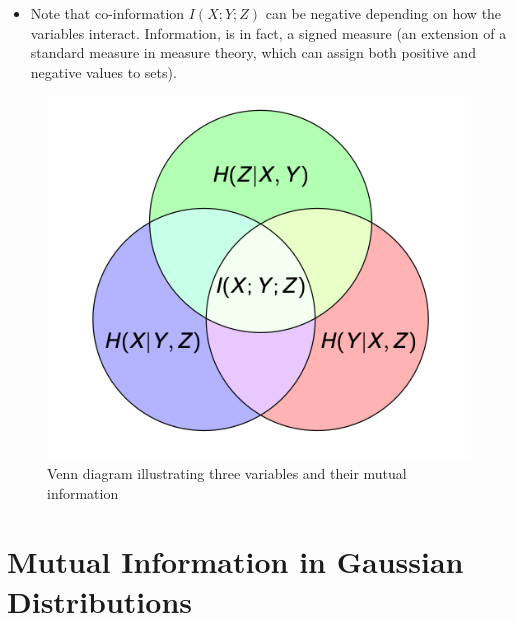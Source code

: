 \begin{itemize}
    \item Note that co-information \( I(X; Y; Z) \) can be negative depending on how the variables interact. Information, is in fact, a signed measure (an extension of a standard measure in measure theory, which can assign both positive and negative values to sets).
\end{itemize}

\begin{figure}[t]
    \centering
    \includegraphics[width=0.6\linewidth]{img/hi_venn_co.png}
    \caption{Venn diagram illustrating three variables and their mutual information}
\end{figure}


\section{Mutual Information in Gaussian Distributions}


